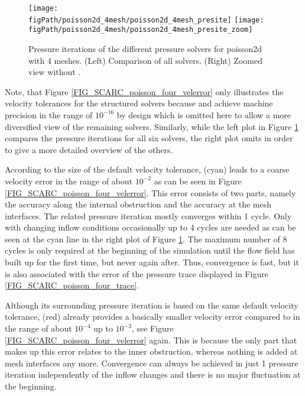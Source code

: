 \begin{figure}[ht]
\begin{center}
\texttt{[image: \\figPath/poisson2d\_4mesh/poisson2d\_4mesh\_presite]}
\texttt{[image: \\figPath/poisson2d\_4mesh/poisson2d\_4mesh\_presite\_zoom]}
\end{center}
\caption[Pressure iterations of the different pressure solvers for {\ct poisson2d} with 4 meshes]{Pressure iterations of the different pressure solvers for {\ct poisson2d} with 4 meshes.  (Left) Comparison of all solvers. (Right) Zoomed view  without \ffttight{}.}
\label{FIG_SCARC_poisson_four_presite}
\end{figure}

Note, that Figure \ref{FIG_SCARC_poisson_four_velerror} only illustrates the velocity tolerances for the structured solvers because \uglmat{} and \uscarc{} achieve machine precision in the range of $10^{-16}$ by design which is omitted here to allow a more diversified view of the remaining solvers. Similarly, while the left plot in Figure \ref{FIG_SCARC_poisson_four_presite} compares the pressure iterations for all six solvers, the right plot omits \ffttight{} in order to give a more detailed overview of the others.

According to the size of the default velocity tolerance, \fftdefault{} (cyan) leads to a coarse velocity error in the range of about $10^{-2}$ as can be seen in Figure \ref{FIG_SCARC_poisson_four_velerror}.  
This error consists of two parts, namely the accuracy along the internal obstruction and the accuracy at the mesh interfaces. The related pressure iteration mostly converges within 1 cycle. Only with changing inflow conditions occasionally up to 4 cycles are needed as can be seen at the cyan line in the right plot of Figure \ref{FIG_SCARC_poisson_four_presite}. The maximum number of 8 cycles is only required at the beginning of the simulation until the flow field has built up for the first time, but never again after. Thus, convergence is fast, but it is also associated with the error of the pressure trace displayed in Figure \ref{FIG_SCARC_poisson_four_trace}.

Although its surrounding pressure iteration is based on the same default velocity tolerance, 
\scarcdefault{} (red) already provides a basically smaller velocity error compared to \fftdefault{} in the range of about $10^{-4}$ up to $10^{-3}$, see Figure \ref{FIG_SCARC_poisson_four_velerror} again.
This is because the only part that makes up this error relates to the inner obstruction, whereas nothing is added at mesh interfaces any more.  Convergence can always be achieved in just 1 pressure iteration independently of the inflow changes and there is no major fluctuation at the beginning. 

